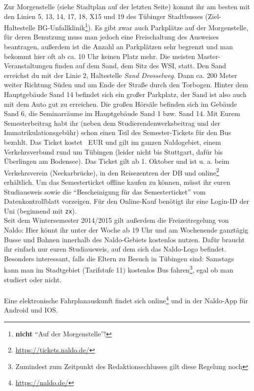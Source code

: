 Zur Morgenstelle (siehe Stadtplan auf der letzten Seite) kommt ihr am besten mit den Linien 5, 13, 14, 17, 18, X15 und 19 des Tübinger
Stadtbusses (Ziel-Haltestelle BG-Unfallklinik\footnote{\textbf{nicht} "`Auf der Morgenstelle"'!}). Es gibt zwar auch Parkplätze auf der Morgenstelle,
für deren Benutzung muss man jedoch eine Freischaltung des Ausweises beantragen, außerdem ist die Anzahl an Parkplätzen sehr begrenzt und man bekommt hier oft ab ca. 10 Uhr keinen Platz mehr.
\ifmaster
Die meisten Master-Veranstaltungen finden auf dem Sand, dem Sitz des WSI, statt. Den Sand erreichst du mit der Linie 2, Haltestelle \emph{Sand Drosselweg}. Dann ca. 200 Meter weiter Richtung Süden und am Ende der Straße durch den Torbogen. Hinter dem Hauptgebäude Sand 14 befindet sich ein großer Parkplatz, der Sand ist also auch mit dem Auto gut zu erreichen. Die großen Hörsäle befinden sich im Gebäude Sand 6, die Seminarräume im Hauptgebäude Sand 1 bzw. Sand 14.
\fi
Mit Eurem Semesterbeitrag habt ihr (neben dem Studierendenwerksbeitrag und der Immatrikulationsgebühr) schon einen Teil des Semester-Tickets für den Bus bezahlt.
Das Ticket kostet \ticketpreis~EUR und gilt im ganzen Naldogebiet, einem Verkehrsverbund rund um
Tübingen (leider nicht bis Stuttgart, dafür bis Überlingen am Bodensee). Das Ticket gilt ab 1. Oktober und ist u. a. beim Verkehrsverein
(Neckarbrücke), in den Reisezentren der DB und online\footnote{\url{https://tickets.naldo.de/}} erhältlich. Um das Semesterticket offline kaufen zu können, müsst ihr euren Studiausweis sowie die "`Bescheinigung für das Semesterticket"' vom Datenkontrollblatt vorzeigen. Für den Online-Kauf benötigt ihr eine Login-ID der Uni (beginnend mit \texttt{zx}).\\
Seit dem Wintersemester 2014/2015 gilt außerdem die Freizeitregelung von Naldo: Hier könnt ihr unter der Woche ab 19 Uhr und am Wochenende ganztägig Busse und Bahnen innerhalb des Naldo-Gebiets kostenlos nutzen. Dafür braucht ihr einfach nur euren Studiausweis, auf dem sich das Naldo-Logo befindet.
Besonders interessant, falls die Eltern zu Besuch in Tübingen sind: Samstags kann man im Stadtgebiet (Tarifstufe 11) kostenlos Bus fahren\footnote{Zumindest zum Zeitpunkt des Redaktionsschlusses gilt diese Regelung noch}, egal ob man studiert oder nicht. \\\\
Eine elektronische Fahrplanauskunft findet sich online\footnote{\url{https://naldo.de/}} und in der Naldo-App für Android und IOS.

